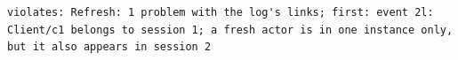 \begin{lstlisting}[language={},basicstyle=\ttfamily\scriptsize,breaklines=true]
violates: Refresh: 1 problem with the log's links; first: event 2l: Client/c1 belongs to session 1; a fresh actor is in one instance only, but it also appears in session 2
\end{lstlisting}
